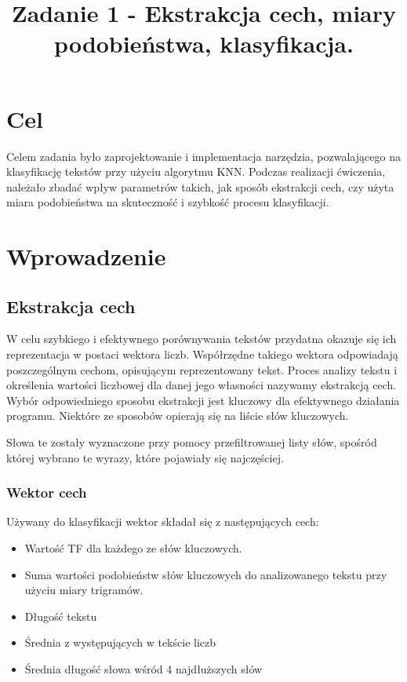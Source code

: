 \documentclass{classrep}
\author{
  \studentinfo{Paweł Młynarczyk}{210278} \and
  \studentinfo{Mateusz Kuźniarek}{210245}
}
\title{Zadanie 1 - Ekstrakcja cech, miary podobieństwa, klasyfikacja.}
\begin{document}
\maketitle

\section{Cel}
Celem zadania było zaprojektowanie i implementacja narzędzia, pozwalającego na klasyfikację tekstów przy użyciu algorytmu KNN. Podczas realizacji ćwiczenia, należało zbadać wpływ parametrów takich, jak sposób ekstrakcji cech, czy użyta miara podobieństwa na skuteczność i szybkość procesu klasyfikacji.

\section{Wprowadzenie}
\subsection{Ekstrakcja cech}
W celu szybkiego i efektywnego porównywania tekstów przydatna okazuje się ich reprezentacja w postaci wektora liczb. Współrzędne takiego wektora odpowiadają poszczególnym cechom, opisującym reprezentowany tekst. Proces analizy tekstu i określenia wartości liczbowej dla danej jego własności nazywamy ekstrakcją cech. Wybór odpowiedniego sposobu ekstrakcji jest kluczowy dla efektywnego działania programu. Niektóre ze sposobów opierają się na liście słów kluczowych.

Słowa te zostały wyznaczone przy pomocy przefiltrowanej listy słów, spośród której wybrano te wyrazy, które pojawiały się najczęściej.

\subsubsection{Wektor cech}
Używany do klasyfikacji wektor składał się z następujących cech:
\begin{itemize}
	\item Wartość TF dla każdego ze słów kluczowych.
	\item Suma wartości podobieństw słów kluczowych do analizowanego tekstu przy użyciu miary trigramów.
	\item Długość tekstu
	\item Średnia z występujących w tekście liczb
	\item Średnia długość słowa wśród 4 najdłuższych słów
\end{itemize}
\end{document}
